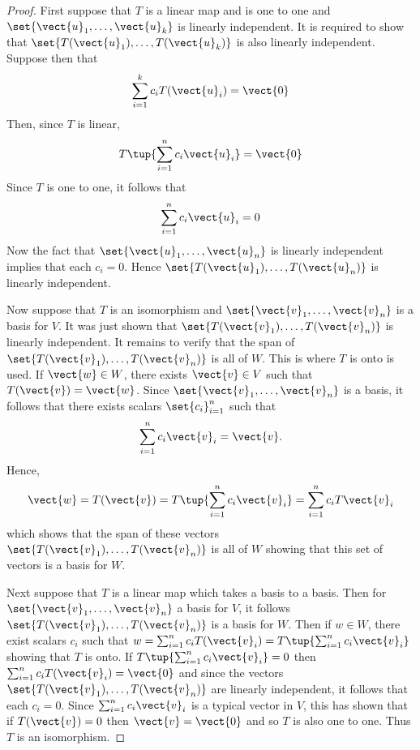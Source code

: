 \begin{proof}
First suppose that $T$ is a linear map and is one to one
and $\set{\vect{u}_{1},\ldots,\vect{u}_{k}} $ is linearly
independent. It is required to show that $\set{T(\vect{u}_{1}),\ldots,T(\vect{u}_{k})} $ is also linearly independent. Suppose then that 
\begin{equation*}
\sum_{i=1}^{k}c_{i}T(\vect{u}_{i})=\vect{0}
\end{equation*}
Then, since $T$ is linear, 
\begin{equation*}
T\tup{\sum_{i=1}^{n}c_{i}\vect{u}_{i}} =\vect{0}
\end{equation*}
Since $T$ is one to one, it follows that 
\begin{equation*}
\sum_{i=1}^{n}c_{i}\vect{u}_{i}=0
\end{equation*}
Now the fact that $\set{\vect{u}_{1},\ldots,\vect{u}_{n}} $ is
linearly independent implies that each $c_{i}=0$. Hence $\set{T(\vect{u}
_{1}),\ldots,T(\vect{u}_{n})} $ is linearly independent.

Now suppose that $T$ is an isomorphism and $\set{\vect{v}_{1},\ldots,\vect{
v}_{n}} $ is a basis for $V$. It was just shown that $\set{T(\vect{v}
_{1}),\ldots,T(\vect{v}_{n})} $ is linearly independent. It remains to
verify that the span of $\set{T(\vect{v}_{1}),\ldots,T(\vect{v}_{n})} $
is all of $W$. This is where $T$ is onto is used. If $\vect{w}\in W$, there
exists $\vect{v}\in V$ such that $T(\vect{v})=\vect{w}$. Since $\set{\vect{v}
_{1},\ldots,\vect{v}_{n}} $ is a basis, it follows that there exists
scalars $\set{c_{i}} _{i=1}^{n}$ such that 
\begin{equation*}
\sum_{i=1}^{n}c_{i}\vect{v}_{i}=\vect{v}.
\end{equation*}
Hence, 
\begin{equation*}
\vect{w}=T(\vect{v})=T\tup{\sum_{i=1}^{n}c_{i}\vect{v}_{i}}
=\sum_{i=1}^{n}c_{i}T\vect{v}_{i}
\end{equation*}
which shows that the span of these vectors $\set{T(\vect{v}_{1}),\ldots,T
(\vect{v}_{n})} $ is all of $W$ showing that this set of vectors is a
basis for $W$.

Next suppose that $T$ is a linear map which takes a basis to a basis. Then
for $\set{\vect{v}_{1},\ldots,\vect{v}_{n}} $ a basis for $V$, it
follows $\set{T(\vect{v}_{1}),\ldots,T(\vect{v}_{n})} $ is a basis for $
W$. Then if $w\in W$, there exist scalars $c_{i}$ such that $
w=\sum_{i=1}^{n}c_{i}T(\vect{v}_{i})=T\tup{\sum_{i=1}^{n}c_{i}\vect{v}_{i}} $
showing that $T$ is onto. If $T\tup{\sum_{i=1}^{n}c_{i}\vect{v}_{i}} =0$
then $\sum_{i=1}^{n}c_{i}T(\vect{v}_{i})=\vect{0}$ and since the vectors $\set{T(\vect{v}
_{1}),\ldots,T(\vect{v}_{n})} $ are linearly independent, it follows
that each $c_{i}=0$. Since $\sum_{i=1}^{n}c_{i}\vect{v}_{i}$ is a typical vector in 
$V$, this has shown that if $T(\vect{v})=0$ then $\vect{v}=\vect{0}$ and so $T$ is also one to one.
Thus $T$ is an isomorphism.
\end{proof}

